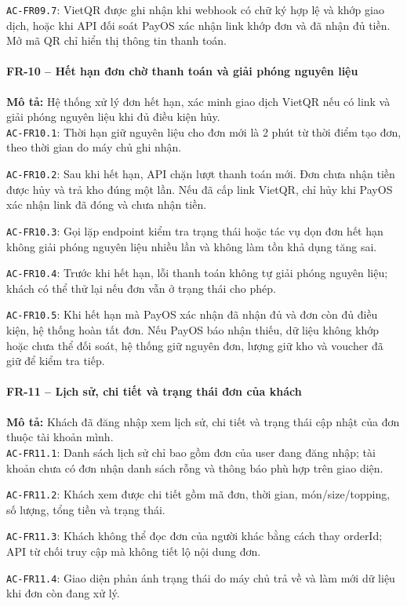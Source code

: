 \noindent\texttt{AC-FR09.7}: VietQR được ghi nhận khi webhook có chữ ký hợp lệ và khớp giao dịch, hoặc khi API đối soát PayOS xác nhận link khớp đơn và đã nhận đủ tiền. Mở mã QR chỉ hiển thị thông tin thanh toán.\par

\paragraph{FR-10 -- Hết hạn đơn chờ thanh toán và giải phóng nguyên liệu}
\textbf{Mô tả:} Hệ thống xử lý đơn hết hạn, xác minh giao dịch VietQR nếu có link và giải phóng nguyên liệu khi đủ điều kiện hủy.\\
\noindent\texttt{AC-FR10.1}: Thời hạn giữ nguyên liệu cho đơn mới là 2 phút từ thời điểm tạo đơn, theo thời gian do máy chủ ghi nhận.\par
\noindent\texttt{AC-FR10.2}: Sau khi hết hạn, API chặn lượt thanh toán mới. Đơn chưa nhận tiền được hủy và trả kho đúng một lần. Nếu đã cấp link VietQR, chỉ hủy khi PayOS xác nhận link đã đóng và chưa nhận tiền.\par
\noindent\texttt{AC-FR10.3}: Gọi lặp endpoint kiểm tra trạng thái hoặc tác vụ dọn đơn hết hạn không giải phóng nguyên liệu nhiều lần và không làm tồn khả dụng tăng sai.\par
\noindent\texttt{AC-FR10.4}: Trước khi hết hạn, lỗi thanh toán không tự giải phóng nguyên liệu; khách có thể thử lại nếu đơn vẫn ở trạng thái cho phép.\par

\noindent\texttt{AC-FR10.5}: Khi hết hạn mà PayOS xác nhận đã nhận đủ và đơn còn đủ điều kiện, hệ thống hoàn tất đơn. Nếu PayOS báo nhận thiếu, dữ liệu không khớp hoặc chưa thể đối soát, hệ thống giữ nguyên đơn, lượng giữ kho và voucher đã giữ để kiểm tra tiếp.\par

\paragraph{FR-11 -- Lịch sử, chi tiết và trạng thái đơn của khách}
\textbf{Mô tả:} Khách đã đăng nhập xem lịch sử, chi tiết và trạng thái cập nhật của đơn thuộc tài khoản mình.\\
\noindent\texttt{AC-FR11.1}: Danh sách lịch sử chỉ bao gồm đơn của user đang đăng nhập; tài khoản chưa có đơn nhận danh sách rỗng và thông báo phù hợp trên giao diện.\par
\noindent\texttt{AC-FR11.2}: Khách xem được chi tiết gồm mã đơn, thời gian, món/size/topping, số lượng, tổng tiền và trạng thái.\par
\noindent\texttt{AC-FR11.3}: Khách không thể đọc đơn của người khác bằng cách thay orderId; API từ chối truy cập mà không tiết lộ nội dung đơn.\par
\noindent\texttt{AC-FR11.4}: Giao diện phản ánh trạng thái do máy chủ trả về và làm mới dữ liệu khi đơn còn đang xử lý.\par

